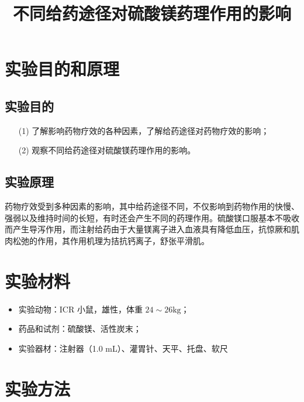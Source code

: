 \documentclass[UTF8]{ctexart}
\title{不同给药途径对硫酸镁药理作用的影响}
\author{}
\begin{document}
\date{}
\maketitle

\section{实验目的和原理}

\subsection{实验目的}

\begin{itemize}
    \item [(1)] 了解影响药物疗效的各种因素，了解给药途径对药物疗效的影响；
    \item [(2)] 观察不同给药途径对硫酸镁药理作用的影响。
\end{itemize}

\subsection{实验原理}

药物疗效受到多种因素的影响，其中给药途径不同，不仅影响到药物作用的快慢、强弱以及维持时间的长短，有时还会产生不同的药理作用。硫酸镁口服基本不吸收而产生导泻作用，而注射给药由于大量镁离子进入血液具有降低血压，抗惊厥和肌肉松弛的作用，其作用机理为拮抗钙离子，舒张平滑肌。

\section{实验材料}

\begin{itemize}
    \item 实验动物：ICR 小鼠，雄性，体重 $24\sim 26\text{kg}$；
    \item 药品和试剂：硫酸镁、活性炭末；
    \item 实验器材：注射器（1.0 mL）、灌胃针、天平、托盘、软尺
\end{itemize}

\section{实验方法}
\end{document}
